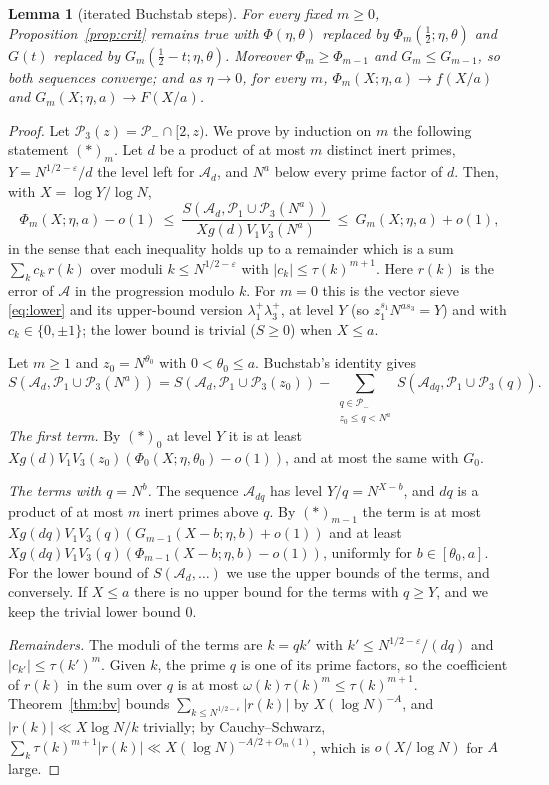 \documentclass[11pt]{amsart}
\newtheorem{lemma}[theorem]{Lemma}
\theoremstyle{remark}
\newcommand{\e}{\varepsilon}
\newcommand{\cA}{\mathcal A}
\newcommand{\cP}{\mathcal P}
\begin{document}
\begin{lemma}[iterated Buchstab steps]\label{lem:buch}
For every fixed $m\ge0$, Proposition~\ref{prop:crit} remains true with $\Phi(\eta,\theta)$ replaced by $\Phi_m(\frac12;\eta,\theta)$ and $G(t)$ replaced by $G_m(\frac12-t;\eta,\theta)$. Moreover $\Phi_m\ge\Phi_{m-1}$ and $G_m\le G_{m-1}$, so both sequences converge; and as $\eta\to0$, for every $m$, $\Phi_m(X;\eta,a)\to f(X/a)$ and $G_m(X;\eta,a)\to F(X/a)$.
\end{lemma}
\begin{proof}
Let $\cP_3(z)=\cP_-\cap[2,z)$. We prove by induction on $m$ the following statement $(\ast)_m$. Let $d$ be a product of at most $m$ distinct inert primes, $Y=N^{1/2-\e}/d$ the level left for $\cA_d$, and $N^a$ below every prime factor of $d$. Then, with $X=\log Y/\log N$,
\[
\Phi_m(X;\eta,a)-o(1)\ \le\ \frac{S(\cA_d,\cP_1\cup\cP_3(N^a))}{Xg(d)V_1V_3(N^a)}\ \le\ G_m(X;\eta,a)+o(1),
\]
in the sense that each inequality holds up to a remainder which is a sum $\sum_kc_k\,r(k)$ over moduli $k\le N^{1/2-\e}$ with $|c_k|\le\tau(k)^{m+1}$. Here $r(k)$ is the error of $\cA$ in the progression modulo $k$. For $m=0$ this is the vector sieve \eqref{eq:lower} and its upper-bound version $\lambda_1^+\lambda_3^+$, at level $Y$ (so $z_1^{s_1}N^{as_3}=Y$) and with $c_k\in\{0,\pm1\}$; the lower bound is trivial ($S\ge0$) when $X\le a$.

Let $m\ge1$ and $z_0=N^{\theta_0}$ with $0<\theta_0\le a$. Buchstab's identity gives
\[
S(\cA_d,\cP_1\cup\cP_3(N^a))=S(\cA_d,\cP_1\cup\cP_3(z_0))-\sum_{\substack{q\in\cP_-\\ z_0\le q<N^a}}S(\cA_{dq},\cP_1\cup\cP_3(q)).
\]
\emph{The first term.} By $(\ast)_0$ at level $Y$ it is at least $Xg(d)V_1V_3(z_0)(\Phi_0(X;\eta,\theta_0)-o(1))$, and at most the same with $G_0$.

\emph{The terms with $q=N^b$.} The sequence $\cA_{dq}$ has level $Y/q=N^{X-b}$, and $dq$ is a product of at most $m$ inert primes above $q$. By $(\ast)_{m-1}$ the term is at most $Xg(dq)V_1V_3(q)(G_{m-1}(X-b;\eta,b)+o(1))$ and at least $Xg(dq)V_1V_3(q)(\Phi_{m-1}(X-b;\eta,b)-o(1))$, uniformly for $b\in[\theta_0,a]$. For the lower bound of $S(\cA_d,\dots)$ we use the upper bounds of the terms, and conversely. If $X\le a$ there is no upper bound for the terms with $q\ge Y$, and we keep the trivial lower bound $0$.

\emph{Remainders.} The moduli of the terms are $k=qk'$ with $k'\le N^{1/2-\e}/(dq)$ and $|c_{k'}|\le\tau(k')^{m}$. Given $k$, the prime $q$ is one of its prime factors, so the coefficient of $r(k)$ in the sum over $q$ is at most $\omega(k)\tau(k)^m\le\tau(k)^{m+1}$. Theorem~\ref{thm:bv} bounds $\sum_{k\le N^{1/2-\e}}|r(k)|$ by $X(\log N)^{-A}$, and $|r(k)|\ll X\log N/k$ trivially; by Cauchy--Schwarz, $\sum_k\tau(k)^{m+1}|r(k)|\ll X(\log N)^{-A/2+O_m(1)}$, which is $o(X/\log N)$ for $A$ large.


\end{proof}
\end{document}
